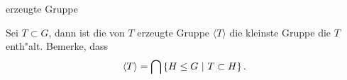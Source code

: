 \documentclass[class=article, crop=false]{standalone}
\begin{document}
\begin{zettel}{erzeugte Gruppe}
\begin{flashcard}
    \begin{definition}
        Sei $T \subset G$, dann ist die von $T$ erzeugte Gruppe $ \langle T\rangle $ die kleinste Gruppe die $T$ enth"alt.
        Bemerke, dass
\[
        \langle T\rangle  = \bigcap \set{H \leq G}{T \subset H}
.\]
\end{definition}

\end{flashcard}
\end{zettel}
\end{document}
